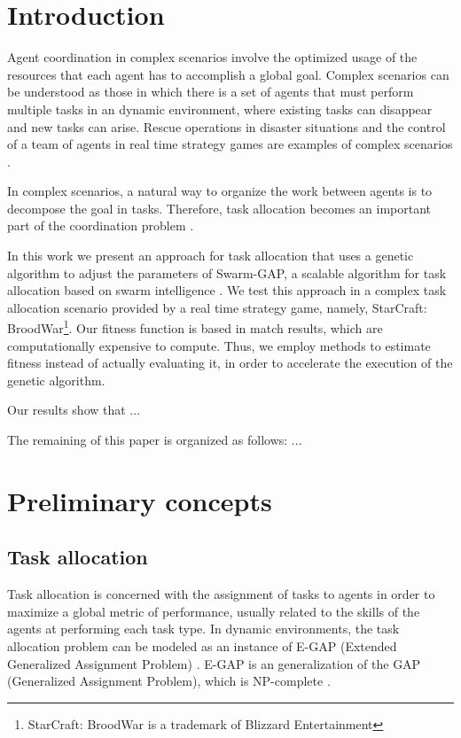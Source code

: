 \documentclass[conference]{IEEEtran}
\begin{document}
\section{Introduction}
\label{sec:intro}
Agent coordination in complex scenarios involve the optimized usage of the resources that each agent has to accomplish a global goal. Complex scenarios can be understood as those in which there is a set of agents that must perform multiple tasks in an dynamic environment, where existing tasks can disappear and new tasks can arise. Rescue operations in disaster situations \cite{Kitano2000} and the control of a team of agents in real time strategy games are examples of complex scenarios \cite{Weber+2011}.

In complex scenarios, a natural way to organize the work between agents is to decompose the goal in tasks. Therefore, task allocation becomes an important part of the coordination problem \cite{Ferreira+2008ccmms}. 

In this work we present an approach for task allocation that uses a genetic algorithm to adjust the parameters of Swarm-GAP, a scalable algorithm for task allocation based on swarm intelligence \cite{Ferreira+2008ccmms}. We test this approach in a complex task allocation scenario provided by a real time strategy game, namely, StarCraft: BroodWar\footnote{StarCraft: BroodWar is a trademark of Blizzard Entertainment}. Our fitness function is based in match results, which are computationally expensive to compute. Thus, we employ methods to estimate fitness instead of actually evaluating it, in order to accelerate the execution of the genetic algorithm.

Our results show that ...

The remaining of this paper is organized as follows: ...

\section{Preliminary concepts}
\label{sec:concepts}


\subsection{Task allocation}
\label{sec:ta}

Task allocation is concerned with the assignment of tasks to agents in order to maximize a global metric of performance, usually related to the skills of the agents at performing each task type. In dynamic environments, the task allocation problem can be modeled as an instance of E-GAP (Extended Generalized Assignment Problem) \cite{Scerri+2005}. E-GAP is an generalization of the GAP (Generalized Assignment Problem), which is NP-complete \cite{Shmoys&Tardos1993}. 
\end{document}

